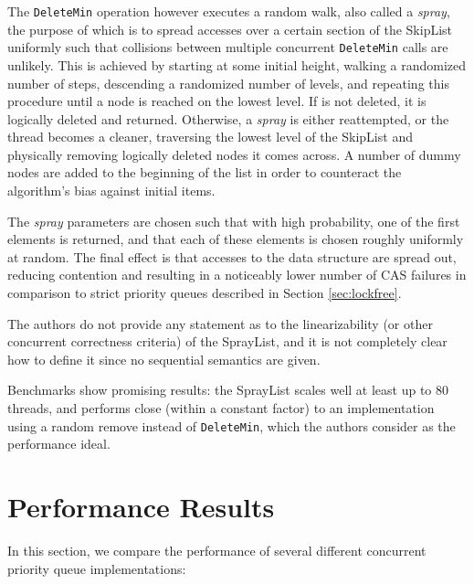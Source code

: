 \documentclass[a4paper,10pt]{article}
\begin{document}
The \lstinline|DeleteMin| operation however executes a random walk, also called a \emph{spray}, the
purpose of which is to spread accesses over a certain section of the SkipList uniformly such that
collisions between multiple concurrent \lstinline|DeleteMin| calls are unlikely. This is achieved by
starting at some initial height, walking a randomized number of steps, descending a randomized number of levels,
and repeating this procedure until a node  is reached on the lowest level. If  is not deleted,
it is logically deleted and returned. Otherwise, a \emph{spray} is either reattempted, or the thread
becomes a cleaner, traversing the lowest level of the SkipList and physically removing logically deleted
nodes it comes across. A number of dummy nodes are added to the beginning of the list in order to counteract
the algorithm's bias against initial items.

The \emph{spray} parameters are chosen such that with high probability, one of the 
first elements is returned, and that each of these elements is chosen roughly uniformly at random.
The final effect is that accesses to the data structure are spread out, reducing contention and resulting
in a noticeably lower number of \ac{CAS} failures in comparison to strict priority queues described
in Section \ref{sec:lockfree}.

The authors do not provide any statement as to the linearizability (or other concurrent correctness
criteria) of the SprayList, and it is not completely clear how to define it since no
sequential semantics are given.

Benchmarks show promising results: the SprayList scales well at least up to 80 threads,
and performs close (within a constant factor) to an implementation using a random remove instead
of \lstinline|DeleteMin|, which the authors consider as the performance ideal.



\section{Performance Results}

In this section, we compare the performance of several different concurrent priority
queue implementations:
\end{document}
